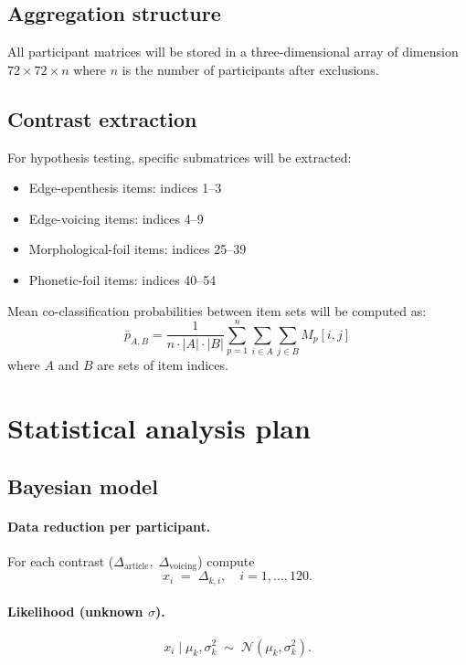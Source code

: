 \documentclass[12pt]{article}
\begin{document}
\begin{enumerate}
\subsection{Aggregation structure}
All participant matrices will be stored in a three-dimensional array of dimension $72 \times 72 \times n$ where $n$ is the number of participants after exclusions.

\subsection{Contrast extraction}
For hypothesis testing, specific submatrices will be extracted:
\begin{itemize}
\item Edge-epenthesis items: indices 1--3
\item Edge-voicing items: indices 4--9
\item Morphological-foil items: indices 25--39
\item Phonetic-foil items: indices 40--54
\end{itemize}

Mean co-classification probabilities between item sets will be computed as:
\begin{equation}
\bar{p}_{A,B} = \frac{1}{n \cdot |A| \cdot |B|} \sum_{p=1}^{n} \sum_{i \in A} \sum_{j \in B} M_p[i,j]
\end{equation}
where $A$ and $B$ are sets of item indices.

\section{Statistical analysis plan}

\subsection{Bayesian model}

\paragraph{Data reduction per participant.}
For each contrast (\(\Delta_{\text{article}},\;\Delta_{\text{voicing}}\)) compute
\[
x_i \;=\; \Delta_{k,i},\quad i = 1,\dots, 120.
\]

\paragraph{Likelihood (unknown $\sigma$).}
\[
x_i \mid \mu_k,\sigma_k^2 \;\sim\; \mathcal N(\mu_k,\sigma_k^2).
\]


\end{enumerate}
\end{document}
